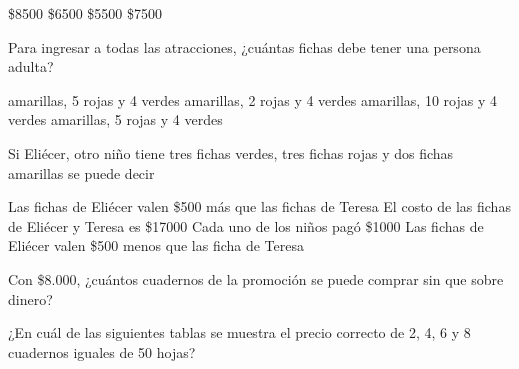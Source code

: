 \documentclass[10pt,letterpaper,addpoints]{exam}
\begin{document}
\begin{multicols}{2}
\begin{questions}
\begin{oneparchoices}
\CorrectChoice \$8500
\choice \$6500
\choice \$5500
\choice \$7500
\end{oneparchoices}
\question
Para ingresar a todas las atracciones, ¿cuántas fichas  debe tener una persona adulta?
\begin{choices}
 amarillas, 5 rojas y 4 verdes
 amarillas, 2 rojas y 4 verdes
 amarillas, 10 rojas y 4 verdes
 amarillas, 5 rojas y 4 verdes
\end{choices}
\question \label{lastquest}
Si Eli\'ecer, otro niño tiene tres fichas verdes, tres fichas rojas y dos fichas amarillas se puede decir
\begin{choices}
\choice Las fichas de Eli\'ecer valen \$500 m\'as que las fichas de Teresa
\CorrectChoice El costo de las fichas de Eli\'ecer y Teresa es \$17000
\choice Cada uno de los niños pag\'o \$1000
\choice Las fichas de Eli\'ecer valen \$500 menos que las ficha de Teresa
\end{choices}
\question \label{q01}
Con \$8.000, ¿cuántos cuadernos de la promoción se puede comprar sin que sobre dinero?

\begin{oneparchoices}
\end{oneparchoices}
\question \label{q02}
¿En cuál de las siguientes tablas se muestra el precio correcto de 2, 4, 6 y 8 cuadernos iguales de 50 hojas?


\end{questions}
\end{multicols}
\end{document}
